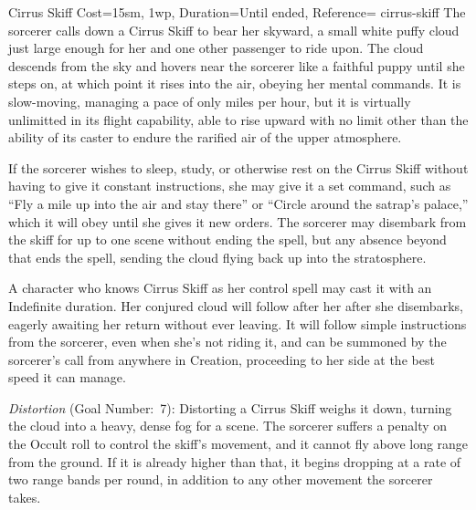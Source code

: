 \begin{Spell}{Cirrus Skiff}{%
    Cost={15sm, 1wp},
    Duration=Until ended,
    Reference=\cite*[p.471]{ex3}
}{cirrus-skiff}
    The sorcerer calls down a Cirrus Skiff to bear her skyward, a small white
    puffy cloud just large enough for her and one other passenger to ride upon.
    The cloud descends from the sky and hovers near the sorcerer like a
    faithful puppy until she steps on, at which point it rises into the air,
    obeying her mental commands. It is slow-moving, managing a pace of only
     miles per hour, but it is virtually
    unlimitted in its flight capability, able to rise upward with no limit
    other than the ability of its caster to endure the rarified air of the
    upper atmosphere. 

    If the sorcerer wishes to sleep, study, or otherwise rest on the Cirrus
    Skiff without having to give it constant instructions, she may give it a
    set command, such as ``Fly a mile up into the air and stay there'' or
    ``Circle around the satrap's palace,'' which it will obey until she gives
    it new orders. The sorcerer may disembark from the skiff for up to one
    scene without ending the spell, but any absence beyond that ends the spell,
    sending the cloud flying back up into the stratosphere.

    A character who knows Cirrus Skiff as her control spell may cast it with an
    Indefinite duration. Her conjured cloud will follow after her after she
    disembarks, eagerly awaiting her return without ever leaving. It will
    follow simple instructions from the sorcerer, even when she's not riding
    it, and can be summoned by the sorcerer's call from anywhere in Creation,
    proceeding to her side at the best speed it can manage.

    \textit{Distortion} (Goal Number:~7): Distorting a Cirrus Skiff weighs
    it down, turning the cloud into a heavy, dense fog for a scene. The
    sorcerer suffers a  penalty on the Occult roll to control the
    skiff's movement, and it cannot fly above long range from the ground. If it
    is already higher than that, it begins dropping at a rate of two range
    bands per round, in addition to any other movement the sorcerer takes.
\end{Spell}


